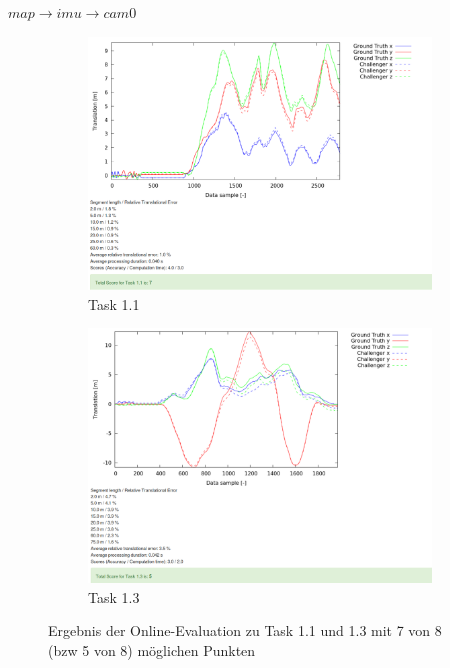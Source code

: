 \documentclass[12pt,titlepage, a4paper]{article}
\begin{document}
$  map \rightarrow imu \rightarrow cam0 $\\

\begin{figure}[t]
 \centering
  \begin{subfigure}[b]{0.49\textwidth}
 \includegraphics[width=\textwidth]{./Screens/t1_opt2_april.png}\caption{Task 1.1}\label{fig:evat1}  \end{subfigure}
  \begin{subfigure}[b]{0.49\textwidth}
 \includegraphics[width=\textwidth]{./Screens/t1_3.png}\caption{Task 1.3}\label{fig:evat3}
 \end{subfigure}
 \caption{Ergebnis der Online-Evaluation zu Task 1.1 und 1.3 mit 7 von 8 (bzw 5 von 8) möglichen Punkten} \label{fig:eva} 

\end{figure}
\end{document}
